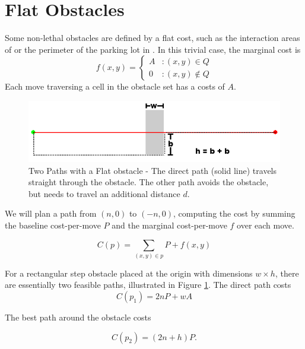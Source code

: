 \section{Flat Obstacles}
Some non-lethal obstacles are defined by a flat cost, such as the interaction areas of \citet{fraichard:anthronav} or the perimeter of the parking lot in \citet{likhachev:costmaps}. In this trivial case, the marginal cost is
\begin{equation}
   \displaystyle
   f(x, y) = \left\{
     \begin{array}{lr}
       A & : (x,y) \in Q\\
       0 & : (x,y) \notin Q
     \end{array}
   \right.
\end{equation}
Each move traversing a cell in the obstacle set has a costs of $A$. 

\begin{figure}[b]
\includegraphics[width=\columnwidth]{graphix/Constant.png}
\caption{Two Paths with a Flat obstacle - The direct path (solid line) travels straight through the obstacle. The other path avoids the obstacle, but needs to travel an additional distance $d$.}
\label{fig:constant}
\end{figure}

We will plan a path from $(n, 0)$ to $(-n, 0)$, computing the cost by summing the baseline cost-per-move $P$ and the marginal cost-per-move $f$ over each move.

\begin{equation}
C(p) = \sum\limits_{(x,y)\in p} P + f(x, y)
\end{equation}

For a rectangular step obstacle placed at the origin with dimensions $w\times h$, there are essentially two feasible paths, illustrated in Figure \ref{fig:constant}. The direct path costs
\begin{equation}
C(p_1) = 2nP + wA
\end{equation}

The best path around the obstacle costs

\begin{equation}
C(p_2) = (2n + h)P.
\end{equation}

